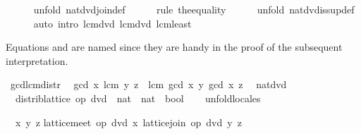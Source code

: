 \begin{isabellebody}
\ \ \ \ \isamarkupfalse%
\ {\isacharparenleft}unfold\ nat{\isacharunderscore}dvd{\isachardot}join{\isacharunderscore}def{\isacharparenright}\isanewline
\ \ \ \ \isamarkupfalse%
\ {\isacharparenleft}rule\ the{\isacharunderscore}equality{\isacharparenright}\isanewline
\ \ \ \ \isamarkupfalse%
\ {\isacharparenleft}unfold\ nat{\isacharunderscore}dvd{\isachardot}is{\isacharunderscore}sup{\isacharunderscore}def{\isacharparenright}\isanewline
\ \ \ \ \isamarkupfalse%
\ {\isacharparenleft}auto\ intro{\isacharcolon}\ lcm{\isacharunderscore}dvd{}\ lcm{\isacharunderscore}dvd{}\ lcm{\isacharunderscore}least{\isacharparenright}\isanewline
{}\isamarkupfalse%
%
\endisatagproof
{\isafoldproof}%
%
\isadelimproof
%
\endisadelimproof
%
\begin{isamarkuptext}%
Equations  and  are named since they are handy in the proof of
  the subsequent interpretation.%
\end{isamarkuptext}%
\isamarkuptrue%
%
\isadeliminvisible
%
\endisadeliminvisible
%
\isataginvisible
{}\isamarkupfalse%
\ gcd{\isacharunderscore}lcm{\isacharunderscore}distr{\isacharcolon}\isanewline
\ \ {\isachardoublequoteopen}gcd\ x\ {\isacharparenleft}lcm\ y\ z{\isacharparenright}\ {\isacharequal}\ lcm\ {\isacharparenleft}gcd\ x\ y{\isacharparenright}\ {\isacharparenleft}gcd\ x\ z{\isacharparenright}{\isachardoublequoteclose}\ \isamarkupfalse%
%
\endisataginvisible
{\isafoldinvisible}%
%
\isadeliminvisible
%
\endisadeliminvisible
\isanewline
%
\isadelimvisible
\isanewline
%
\endisadelimvisible
%
\isatagvisible
{}\isamarkupfalse%
\ nat{\isacharunderscore}dvd{\isacharbang}{\isacharcolon}\isanewline
\ \ distrib{\isacharunderscore}lattice\ {\isachardoublequoteopen}op\ dvd\ {\isacharcolon}{\isacharcolon}\ nat\ {\isasymRightarrow}\ nat\ {\isasymRightarrow}\ bool{\isachardoublequoteclose}\isanewline
\ \ \isamarkupfalse%
\ unfold{\isacharunderscore}locales%
\begin{isamarkuptxt}%
\begin{isabelle}%
\ {}{\isachardot}\ {\isasymAnd}x\ y\ z{\isachardot}\isanewline
{}lattice{\isachardot}meet\ op\ dvd\ x\ {\isacharparenleft}lattice{\isachardot}join\ op\ dvd\ y\ z{\isacharparenright}\ {\isacharequal}\isanewline

\end{isabelle}
\end{isamarkuptxt}
\end{isabellebody}
